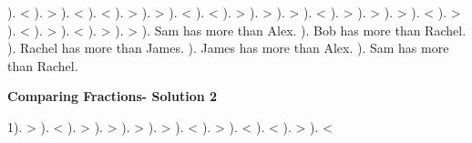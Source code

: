 \documentclass{article}%
\begin{document}
). <%
). >%
). <%
). <%
). >%
). >%
). <%
). <%
). >%
). >%
). >%
). <%
). >%
). >%
). >%
). <%
). >%
). <%
). >%
). <%
). >%
). >%
). Sam has more than Alex.%
). Bob has more than Rachel.%
). Rachel has more than James.%
). James has more than Alex.%
). Sam has more than Rachel.%
\newline%
\newpage%
\large%
\begin{center}%
\textbf{Comparing Fractions- Solution 2}%
\newline%
\end{center} \normalsize%
1). >%
). <%
). >%
). >%
). >%
). >%
). <%
). >%
). <%
). <%
). >%
). <%
\newline%
\end{document}

